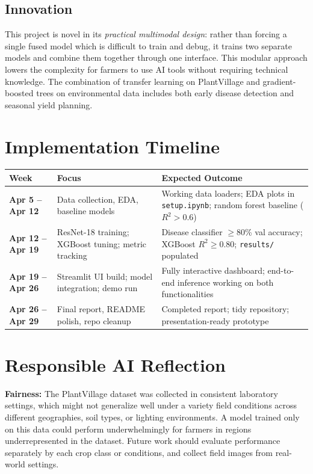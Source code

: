 \documentclass[11pt, letterpaper]{article}
\begin{document}
\subsection{Innovation}
This project is novel in its \textit{practical multimodal design}: rather than forcing a single fused model which is difficult to train and debug, it trains two separate models and combine them together through one interface. This modular approach lowers the complexity for farmers to use AI tools without requiring technical knowledge. The combination of transfer learning on PlantVillage and gradient-boosted trees on environmental data includes both early disease detection and seasonal yield planning.

\section{Implementation Timeline}

\begin{center}
\begin{tabular}{@{}>{\bfseries}p{2.8cm}p{4.5cm}p{5.5cm}@{}}
\toprule
Week & Focus & Expected Outcome \\
\midrule
Apr 5 – Apr 12 &
  Data collection, EDA, baseline models &
  Working data loaders; EDA plots in \texttt{setup.ipynb}; random forest baseline ($R^2 > 0.6$) \\
\addlinespace
Apr 12 – Apr 19 &
  ResNet-18 training; XGBoost tuning; metric tracking &
  Disease classifier $\geq$80\% val accuracy; XGBoost $R^2 \geq 0.80$; \texttt{results/} populated \\
\addlinespace
Apr 19 – Apr 26 &
  Streamlit UI build; model integration; demo run &
  Fully interactive dashboard; end-to-end inference working on both functionalities \\
\addlinespace
Apr 26 – Apr 29 &
  Final report, README polish, repo cleanup &
  Completed report; tidy repository; presentation-ready prototype \\
\bottomrule
\end{tabular}
\end{center}

\section{Responsible AI Reflection}

\textbf{Fairness:} The PlantVillage dataset was collected in consistent laboratory settings, which might not generalize well under a variety field conditions across different geographies, soil types, or lighting environments. A model trained only on this data could perform underwhelmingly for farmers in regions underrepresented in the dataset. Future work should evaluate performance separately by each crop class or conditions, and collect field images from real-world settings.
\end{document}
